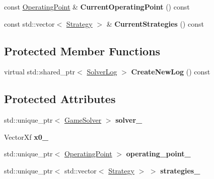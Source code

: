\begin{DoxyCompactItemize}
\item 
const \hyperlink{structilqgames_1_1_operating_point}{Operating\+Point} \& {\bfseries Current\+Operating\+Point} () const \hypertarget{classilqgames_1_1_problem_a49a937329474c57437592f09246c6517}{}\label{classilqgames_1_1_problem_a49a937329474c57437592f09246c6517}

\item 
const std\+::vector$<$ \hyperlink{structilqgames_1_1_strategy}{Strategy} $>$ \& {\bfseries Current\+Strategies} () const \hypertarget{classilqgames_1_1_problem_adb664a8d453bd4431789faf66d95a06a}{}\label{classilqgames_1_1_problem_adb664a8d453bd4431789faf66d95a06a}

\end{DoxyCompactItemize}
\subsection*{Protected Member Functions}
\begin{DoxyCompactItemize}
\item 
virtual std\+::shared\+\_\+ptr$<$ \hyperlink{classilqgames_1_1_solver_log}{Solver\+Log} $>$ {\bfseries Create\+New\+Log} () const \hypertarget{classilqgames_1_1_problem_a13d87495e055335f3da703909c435217}{}\label{classilqgames_1_1_problem_a13d87495e055335f3da703909c435217}

\end{DoxyCompactItemize}
\subsection*{Protected Attributes}
\begin{DoxyCompactItemize}
\item 
std\+::unique\+\_\+ptr$<$ \hyperlink{classilqgames_1_1_game_solver}{Game\+Solver} $>$ {\bfseries solver\+\_\+}\hypertarget{classilqgames_1_1_problem_aa14af0e2e063c99eefefd029d69dbf0d}{}\label{classilqgames_1_1_problem_aa14af0e2e063c99eefefd029d69dbf0d}

\item 
Vector\+Xf {\bfseries x0\+\_\+}\hypertarget{classilqgames_1_1_problem_a41236f0dfbc5eb6b1ddd08a5cc6555b3}{}\label{classilqgames_1_1_problem_a41236f0dfbc5eb6b1ddd08a5cc6555b3}

\item 
std\+::unique\+\_\+ptr$<$ \hyperlink{structilqgames_1_1_operating_point}{Operating\+Point} $>$ {\bfseries operating\+\_\+point\+\_\+}\hypertarget{classilqgames_1_1_problem_a2bb96299dbdc82440d6b90865ee9b2c1}{}\label{classilqgames_1_1_problem_a2bb96299dbdc82440d6b90865ee9b2c1}

\item 
std\+::unique\+\_\+ptr$<$ std\+::vector$<$ \hyperlink{structilqgames_1_1_strategy}{Strategy} $>$ $>$ {\bfseries strategies\+\_\+}\hypertarget{classilqgames_1_1_problem_a305d33a1e20a8ae63c0c581d562c7a64}{}\label{classilqgames_1_1_problem_a305d33a1e20a8ae63c0c581d562c7a64}

\end{DoxyCompactItemize}


